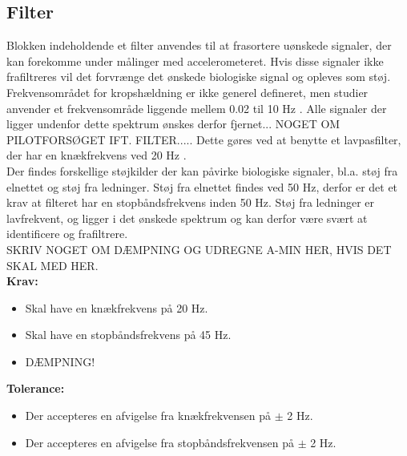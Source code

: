 \subsection{Filter}
Blokken indeholdende et filter anvendes til at frasortere uønskede signaler, der kan forekomme under målinger med accelerometeret. Hvis disse signaler ikke frafiltreres vil det forvrænge det ønskede biologiske signal og opleves som støj. Frekvensområdet for kropshældning er ikke generel defineret, men studier anvender et frekvensområde liggende mellem 0.02 til 10 Hz \cite{Martinez-Mendez2011}. Alle signaler der ligger undenfor dette spektrum ønskes derfor fjernet... NOGET OM PILOTFORSØGET IFT. FILTER..... Dette gøres ved at benytte et lavpasfilter, der har en knækfrekvens ved 20 Hz . \\
Der findes forskellige støjkilder der kan påvirke biologiske signaler, bl.a. støj fra elnettet og støj fra ledninger. Støj fra elnettet findes ved 50 Hz, derfor er det et krav at filteret har en stopbåndsfrekvens inden 50 Hz. Støj fra ledninger er lavfrekvent, og ligger i det ønskede spektrum og kan derfor være svært at identificere og frafiltrere. \\
SKRIV NOGET OM DÆMPNING OG UDREGNE A-MIN HER, HVIS DET SKAL MED HER.\\
\textbf{Krav:}
\begin{itemize}
\item Skal have en knækfrekvens på 20 Hz.
\item Skal have en stopbåndsfrekvens på 45 Hz.
\item DÆMPNING!
\end{itemize}
\textbf{Tolerance:}
\begin{itemize}
\item Der accepteres en afvigelse fra knækfrekvensen på $\pm$ 2 Hz.
\item Der accepteres en afvigelse fra stopbåndsfrekvensen på $\pm$ 2 Hz.
\end{itemize}
